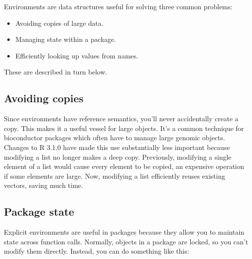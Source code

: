 Environments are data structures useful for solving three common
problems:

\begin{itemize}
\itemsep1pt\parskip0pt
\item
  Avoiding copies of large data.
\item
  Managing state within a package.
\item
  Efficiently looking up values from names.
\end{itemize}

These are described in turn below.

\subsection{Avoiding copies}

Since environments have reference semantics, you'll never accidentally
create a copy. This makes it a useful vessel for large objects. It's a
common technique for bioconductor packages which often have to manage
large genomic objects. Changes to R 3.1.0 have made this use
substantially less important because modifying a list no longer makes a
deep copy. Previously, modifying a single element of a list would cause
every element to be copied, an expensive operation if some elements are
large. Now, modifying a list efficiently reuses existing vectors, saving
much time.

\subsection{Package state}

Explicit environments are useful in packages because they allow you to
maintain state across function calls. Normally, objects in a package are
locked, so you can't modify them directly. Instead, you can do something
like this:

\begin{Shaded}
\begin{Highlighting}[]
\StringTok{ }\NormalTok{(} \NormalTok{())}
\StringTok{ }

\StringTok{ }
\NormalTok{\}}
\StringTok{ }
  \StringTok{ }
  \StringTok{ }
\NormalTok{\}}
\end{Highlighting}
\end{Shaded}

